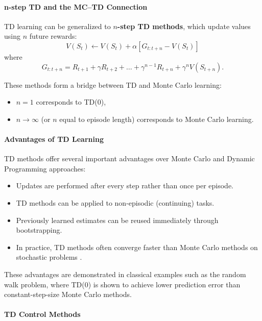 \paragraph{n-step TD and the MC--TD Connection}

TD learning can be generalized to \textbf{$n$-step TD methods}, which update values using $n$ future rewards:
\[
V(S_t) \leftarrow V(S_t) + \alpha \left[ G_{t:t+n} - V(S_t) \right]
\]
where
\[
G_{t:t+n} = R_{t+1} + \gamma R_{t+2} + \dots + \gamma^{n-1} R_{t+n} + \gamma^n V(S_{t+n}).
\]





These methods form a bridge between TD and Monte Carlo learning:
\begin{itemize}
\item $n = 1$ corresponds to TD(0),
\item $n \to \infty$ (or $n$ equal to episode length) corresponds to Monte Carlo learning.
\end{itemize}







\paragraph{Advantages of TD Learning}

TD methods offer several important advantages over Monte Carlo and Dynamic Programming approaches:
\begin{itemize}
\item Updates are performed after every step rather than once per episode.
\item TD methods can be applied to non-episodic (continuing) tasks.
\item Previously learned estimates can be reused immediately through bootstrapping.
\item In practice, TD methods often converge faster than Monte Carlo methods on stochastic problems \cite{sutton}.
\end{itemize}

These advantages are demonstrated in classical examples such as the random walk problem, where TD(0) is shown to achieve lower prediction error than constant-step-size Monte Carlo methods.







\paragraph{TD Control Methods}

